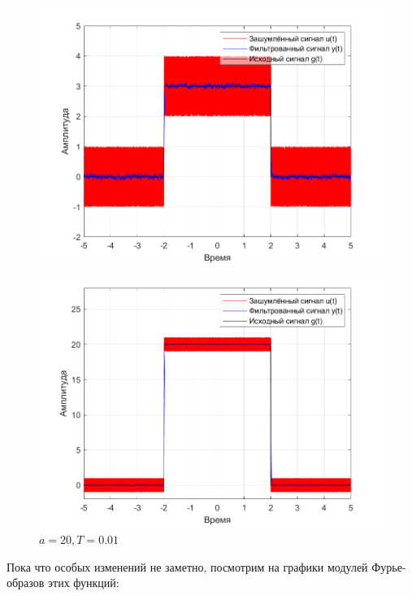\documentclass[a4paper]{article}
\begin{document}
\begin{figure}[H]
    \begin{minipage}{0.5\textwidth}
        \centering
        \includegraphics[width=\linewidth]{ex1_1/a=3_T=0.01/h1.png}
        \caption{$a = 3, T = 0.01$}
    \end{minipage}
    \begin{minipage}{0.5\textwidth}
        \centering
        \includegraphics[width=\linewidth]{ex1_1/a=20_T=0.01/h1.png}
        \caption{$a = 20, T = 0.01$}
    \end{minipage}
\end{figure}

Пока что особых изменений не заметно, посмотрим на графики модулей Фурье-образов этих функций:
\end{document}
